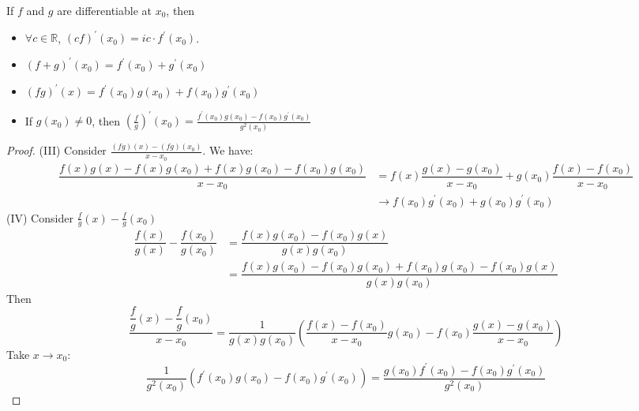 \documentclass{report}
\begin{document}
\begin{theorem}{28.3}
    If $f$ and $g$ are differentiable at $x_{0}$, then 
        \begin{itemize}
            \item $\forall c \in \mathbb{R}$, $(cf)^{\prime}(x_{0}) = ic \cdot f^{\prime}(x_{0})$.

            \item $(f + g)^{\prime}(x_{0}) = f^{\prime}(x_{0}) + g^{\prime}(x_{0})$

            \item $(fg)^{\prime}(x) = f^{\prime}(x_{0})g(x_{0}) + f(x_{0})g^{\prime}(x_{0})$ 

            \item If $g(x_{0}) \neq 0$, then $(\frac{f}{g})^{\prime}(x_{0}) = \frac{f^{\prime}(x_{0})g(x_{0}) - f(x_{0})g^{\prime}(x_{0})}{g^{2}(x_{0})}$
        \end{itemize}
\end{theorem}

\begin{proof}
    (III) Consider $\frac{(fg)(x) - (fg)(x_{0})}{x - x_{0}}$. We have:
        \begin{align*}
            \dfrac{f(x)g(x) - f(x)g(x_{0}) + f(x)g(x_{0}) - f(x_{0})g(x_{0})}{x - x_{0}} &=           f(x)\dfrac{g(x) - g(x_{0})}{x - x_{0}} + g(x_{0})\dfrac{f(x) - f(x_{0})}{x - x_{0}} \\
                                                                                         &\rightarrow  f(x_{0})g^{\prime}(x_{0}) + g(x_{0})g^{\prime}(x_{0})                                
        \end{align*}
    (IV) Consider $\frac{f}{g}(x) - \frac{f}{g}(x_{0})$
        \begin{align*}
            \dfrac{f(x)}{g(x)} - \dfrac{f(x_{0})}{g(x_{0})} &= \dfrac{f(x)g(x_{0}) - f(x_{0})g(x)}{g(x)g(x_{0})}                                       \\
                                                            &= \dfrac{f(x)g(x_{0}) - f(x_{0})g(x_{0}) + f(x_{0})g(x_{0}) - f(x_{0})g(x)}{g(x)g(x_{0})}   
        \end{align*}
    Then 
        \begin{equation*}
            \dfrac{\dfrac{f}{g}(x) - \dfrac{f}{g}(x_{0})}{x - x_{0}} = \dfrac{1}{g(x)g(x_{0})} \left(\dfrac{f(x) - f(x_{0})}{x - x_{0}}g(x_{0}) - f(x_{0}) \dfrac{g(x) - g(x_{0})}{x - x_{0}}\right)
        \end{equation*}
    Take $x \rightarrow x_{0}$:
        \begin{equation*}
            \dfrac{1}{g^{2}(x_{0})}\left(f^{\prime}(x_{0})g(x_{0}) - f(x_{0})g^{\prime}(x_{0})\right) = \dfrac{g(x_{0})f^{\prime}(x_{0}) - f(x_{0})g^{\prime}(x_{0})}{g^{2}(x_{0})}
        \end{equation*}
\end{proof}
\end{document}
